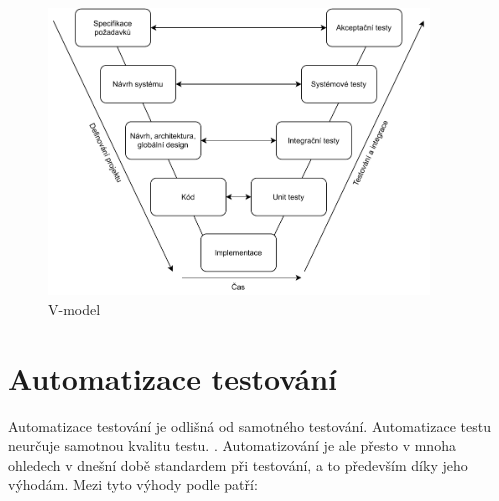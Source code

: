 \begin{figure}[htbp]
    \centering 
    \includegraphics[width=0.9\textwidth]{assets/img/vmodel.pdf}
    \caption{V-model}
    \label{fig:vmodel}
\end{figure}


\section{Automatizace testování}

Automatizace testování je odlišná od samotného testování. Automatizace testu neurčuje samotnou kvalitu testu.  \cite{fewster1999software}. Automatizování je ale přesto v mnoha ohledech v dnešní době standardem při testování, a to především díky jeho výhodám. Mezi tyto výhody podle \cite{fewster1999software} patří:

